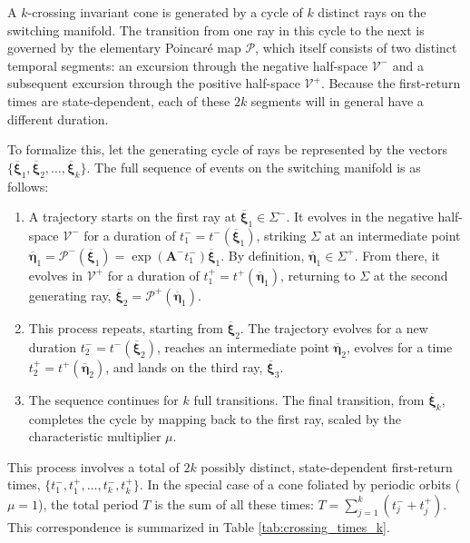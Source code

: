 \documentclass[a4paper,9pt,parskip=half,english]{article}
\theoremstyle{plain}
\theoremstyle{definition}
\newcommand{\veta}{\bm{\eta}}
\newcommand{\vxi}{\bm{\xi}}
\newcommand{\vA}{\mathbf A}
\newcommand{\cVplus}{\mathcal{V}^+}
\newcommand{\cVminus}{\mathcal{V}^-}
\begin{document}
A $k$-crossing invariant cone is generated by a cycle of $k$ distinct rays on the switching manifold. The transition from one ray in this cycle to the next is governed by the elementary Poincaré map $\mathcal{P}$, which itself consists of two distinct temporal segments: an excursion through the negative half-space $\cVminus$ and a subsequent excursion through the positive half-space $\cVplus$. Because the first-return times are state-dependent, each of these $2k$ segments will in general have a different duration.

To formalize this, let the generating cycle of rays be represented by the vectors $\{\overline{\vxi}_1, \overline{\vxi}_2, \dots, \overline{\vxi}_k\}$. The full sequence of events on the switching manifold is as follows:
\begin{enumerate}
	\item A trajectory starts on the first ray at $\overline{\vxi}_1 \in \Sigma^-$. It evolves in the negative half-space $\cVminus$ for a duration of $t_1^- = t^-(\overline{\vxi}_1)$, striking $\Sigma$ at an intermediate point $\overline{\veta}_1 = \mathcal{P}^-(\overline{\vxi}_1) = \exp(\vA^- t_1^-)\overline{\vxi}_1$. By definition, $\overline{\veta}_1 \in \Sigma^+$. From there, it evolves in $\cVplus$ for a duration of $t_1^+ = t^+(\overline{\veta}_1)$, returning to $\Sigma$ at the second generating ray, $\overline{\vxi}_2 = \mathcal{P}^+(\overline{\veta}_1)$.
	\item This process repeats, starting from $\overline{\vxi}_2$. The trajectory evolves for a new duration $t_2^- = t^-(\overline{\vxi}_2)$, reaches an intermediate point $\overline{\veta}_2$, evolves for a time $t_2^+ = t^+(\overline{\veta}_2)$, and lands on the third ray, $\overline{\vxi}_3$.
	\item The sequence continues for $k$ full transitions. The final transition, from $\overline{\vxi}_k$, completes the cycle by mapping back to the first ray, scaled by the characteristic multiplier $\mu$.
\end{enumerate}
This process involves a total of $2k$ possibly distinct, state-dependent first-return times, $\{t_1^-, t_1^+, \dots, t_k^-, t_k^+\}$. In the special case of a cone foliated by periodic orbits ($\mu=1$), the total period $T$ is the sum of all these times: $T = \sum_{j=1}^k (t_j^- + t_j^+)$. This correspondence is summarized in Table \ref{tab:crossing_times_k}.
\end{document}
